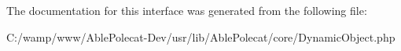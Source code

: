 


The documentation for this interface was generated from the following file\+:\begin{DoxyCompactItemize}
\item 
C\+:/wamp/www/\+Able\+Polecat-\/\+Dev/usr/lib/\+Able\+Polecat/core/Dynamic\+Object.\+php\end{DoxyCompactItemize}
